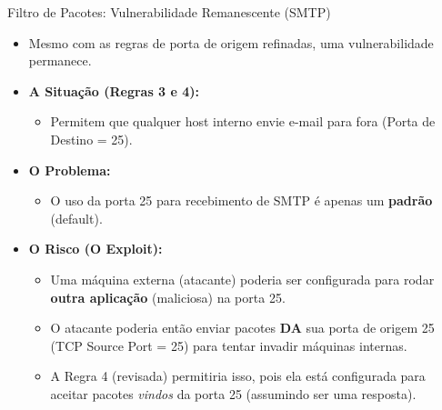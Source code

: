 \begin{frame}{Filtro de Pacotes: Vulnerabilidade Remanescente (SMTP)}
    \begin{itemize}
        \item Mesmo com as regras de porta de origem refinadas, uma vulnerabilidade permanece.

        \item \textbf{A Situação (Regras 3 e 4):}
              \begin{itemize}
                  \item Permitem que qualquer host interno envie e-mail para fora (Porta de Destino = 25).
              \end{itemize}

        \item \textbf{O Problema:}
              \begin{itemize}
                  \item O uso da porta 25 para recebimento de SMTP é apenas um \textbf{padrão} (default).
              \end{itemize}

        \item \textbf{O Risco (O Exploit):}
              \begin{itemize}
                  \item Uma máquina externa (atacante) poderia ser configurada para rodar \textbf{outra aplicação} (maliciosa) na porta 25.
                  \item O atacante poderia então enviar pacotes \textbf{DA} sua porta de origem 25 (TCP Source Port = 25) para tentar invadir máquinas internas.
                  \item A Regra 4 (revisada) permitiria isso, pois ela está configurada para aceitar pacotes \textit{vindos} da porta 25 (assumindo ser uma resposta).
              \end{itemize}
    \end{itemize}
\end{frame}

